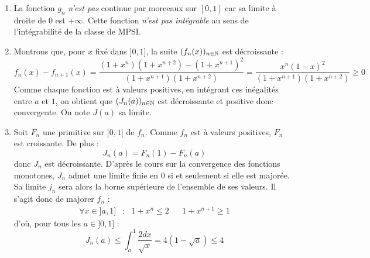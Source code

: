 \begin{enumerate}
\item La fonction $g_n$ \emph{n'est pas} continue par morceaux sur $[0,1]$ car sa limite à droite de $0$ est $+\infty$. Cette fonction \emph{n'est pas intégrable} au sens de l'intégrabilité de la classe de MPSI.
\item Montrons que, pour $x$ fixé dans $]0,1]$, la suite $(f_n(x))_{n\in \mathbb{N}}$ est décroissante :
\begin{displaymath}
 f_{n}(x)-f_{n+1}(x) = \dfrac{(1+x^{n})(1+x^{n+2})-(1+x^{n+1})^{2}}{(1+x^{n+1})(1+x^{n+2})}
=  \dfrac{x^{n}(1-x)^2}{(1+x^{n+1})(1+x^{n+2})} \geq 0
\end{displaymath}
Comme chaque fonction est à valeurs positives, en intégrant ces inégalités entre $a$ et $1$, on obtient que $(J_n(a))_{n\in \mathbb{N}}$ est décroissante et positive donc convergente. On note $J(a)$ sa limite.

\item Soit $F_n$ une primitive sur $]0,1[$ de $f_n$. Comme $f_n$ est à valeurs positives, $F_n$ est croissante. De plus :
\begin{displaymath}
 J_n(a)= F_n(1) - F_n(a)
\end{displaymath}
donc $J_n$ est décroissante. D'après le cours sur la convergence des fonctions monotones, $J_n$ admet une limite finie en $0$ si et seulement si elle est majorée. Sa limite $j_n$ sera alors la borne supérieure de l'ensemble de ses valeurs.\newline
Il s'agit donc de majorer $f_n$ :
\begin{align*}
 \forall x\in ]a,1] &: & 1+x^n \leq 2 & & 1+x^{n+1}\geq 1
\end{align*}
d'où, pour tous les $a\in ]0,1]$ :
\begin{displaymath}
 J_n(a) \leq \int_{a}^{1}\dfrac{2 dx}{\sqrt{x}} = 4(1-\sqrt{a})\leq 4
\end{displaymath}


\end{enumerate}
